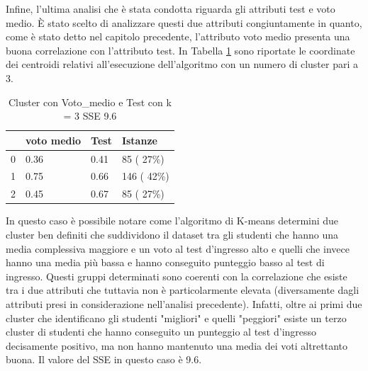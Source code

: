 \documentclass[12pt]{article}
\begin{document}
Infine, l'ultima analisi che è stata condotta riguarda gli attributi test e voto medio. È stato scelto di analizzare 
questi due attributi congiuntamen\-te in quanto, come è stato detto nel capitolo precedente, l'attributo voto medio 
presenta una buona correlazione con l'attributo test. 
In Tabella \ref{c3MT} sono riportate le coordinate dei centroidi relativi all'esecuzione dell'algori\-tmo con un numero di cluster pari a 3.
\begin{table}[ht]
	\centering
	\begin{tabular}{@{}llll@{}}
	\toprule
	  & voto medio & Test  & Istanze\\ \midrule
	0 & 0.36       & 0.41  & 85  ( 27\%)\\
	1 & 0.75       & 0.66  & 146 ( 42\%)\\
	2 & 0.45       & 0.67  & 85  ( 27\%)\\ \bottomrule
	\end{tabular}
	\caption{Cluster con Voto\_medio e Test con k = 3 SSE 9.6}
	\label{c3MT}
\end{table}
In questo caso è possibile notare come
l'algoritmo di K-means determini due cluster ben definiti che suddi\-vidono il dataset tra gli studenti che hanno una
media complessiva mag\-giore e un voto al test d'ingresso alto e quelli che invece hanno una media più bassa e 
hanno conseguito punteggio basso al test di ingresso. Questi gruppi determinati sono coerenti con la correlazione 
che esiste tra i due attributi che tuttavia non è particolarmente elevata (diversamente dagli attributi presi in 
considerazione nell'analisi precedente). Infatti, oltre ai primi due cluster che identificano gli studenti "migliori"
e quelli "peggiori" esiste un terzo cluster di studenti che hanno conseguito un punteggio al test d'ingresso decisamente
positivo, ma non hanno mantenuto una media dei voti altrettanto buona. Il valore del SSE in questo caso è 9.6. 
\end{document}
